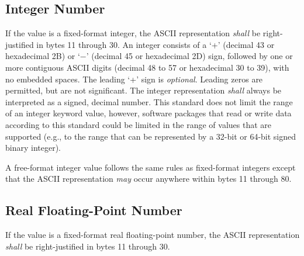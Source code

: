 \documentclass[11pt,makeidx]{book}     %
\begin{document}
   \subsection{Integer Number}
   \label{s:ffi}

   If the value is a fixed-format integer, the ASCII representation {\em shall}
   be right-justified in bytes 11 through 30.  An integer consists of a
   `+' (decimal 43 or hexadecimal 2B) or `$-$' (decimal 45 or hexadecimal 2D) sign, 
   followed by one or more contiguous ASCII digits
   (decimal 48 to 57 or hexadecimal 30 to 39), with no embedded spaces. 
   The leading `+' sign is {\em optional}. 
   Leading zeros are permitted, but are not
   significant.  The integer representation {\em shall} always be interpreted as a signed,
   decimal number.
This standard does not limit the range of 
an integer keyword value, however, software packages that read or write 
data according to this standard could be limited in the range of 
values that are supported (e.g., to the range that 
can be represented by a 32-bit or 64-bit signed binary integer).

   A free-format integer value follows the same rules as fixed-format integers
   except that the ASCII representation {\em may} occur anywhere within bytes 
   11 through 80.
   
   \subsection{Real Floating-Point Number}
   \label{s:ffrfp}
   If the value is a fixed-format real floating-point number, 
   the ASCII
   representation {\em shall} be right-justified in bytes 11 through 30.
\end{document}

